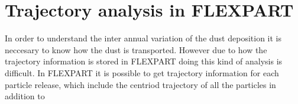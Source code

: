 
\section{Trajectory analysis in FLEXPART}
In order to understand the inter annual variation of the dust deposition it is neccesary to know how the dust is transported. However due to how the trajectory information is stored in FLEXPART doing this kind of analysis is difficult. In FLEXPART it is possible to get trajectory information for each particle release, which include the centriod trajectory of all the particles in addition to   